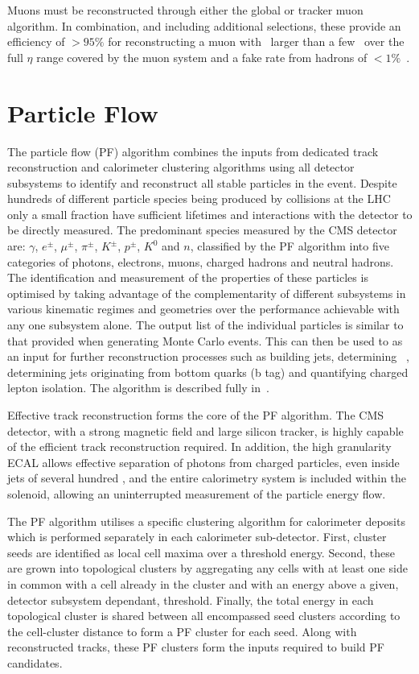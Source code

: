 Muons must be reconstructed through either the global or tracker muon algorithm. In combination, and
including additional selections, these provide an efficiency of $>95\%$ for reconstructing a muon 
with \pt~larger than a few \GeV~over the full $\eta$ range covered by the
muon system and a fake rate from hadrons of $<1\%$~\cite{muon_reco}.

\section{Particle Flow}
\label{sec:particle_flow}
The particle flow (PF) algorithm combines the inputs from dedicated track reconstruction and calorimeter clustering
algorithms using all detector subsystems to identify and reconstruct all stable particles in the event.
Despite hundreds of different particle species being produced by collisions at the LHC only a small fraction
have sufficient lifetimes and interactions with the detector to be directly measured. The predominant species
measured by the CMS detector are: $\gamma$, $e^{\pm}$, $\mu^{\pm}$, $\pi^{\pm}$, $K^{\pm}$, $p^{\pm}$, $K^{0}$
and $n$, classified by the PF algorithm into five categories of photons, electrons, muons, charged hadrons and neutral hadrons. 
The identification and measurement of the properties of these particles is optimised by taking advantage of the complementarity of 
different subsystems in various kinematic regimes and geometries over the performance achievable with 
any one subsystem alone. The output list of the individual particles is similar to that provided
when generating Monte Carlo events. This can then be used to as an input for further reconstruction processes
such as building jets, determining \met~, determining jets originating from bottom quarks (b tag) and quantifying
charged lepton isolation. The algorithm is described fully in~\cite{pf_proc,pf_pas}.

Effective track reconstruction forms the core of the PF algorithm. The CMS detector, with a strong magnetic field
and large silicon tracker, is highly capable of the efficient track
reconstruction required. In addition, the high granularity ECAL allows effective separation of photons from 
charged particles, even inside jets of several hundred \GeV, and the entire calorimetry system 
is included within the solenoid, allowing an uninterrupted measurement 
of the particle energy flow.

The PF algorithm utilises a specific clustering algorithm for calorimeter deposits which is performed separately 
in each calorimeter sub-detector. First, cluster seeds are identified as local cell maxima over a threshold energy.
Second, these are grown into topological clusters by aggregating any cells with at least one side in common with
a cell already in the cluster and with an energy above a given, detector
subsystem dependant, threshold. Finally, the total energy in each topological cluster
is shared between all encompassed seed clusters according to the cell-cluster distance to 
form a PF cluster for each seed. Along with reconstructed tracks, these PF clusters form the inputs 
required to build PF candidates.

